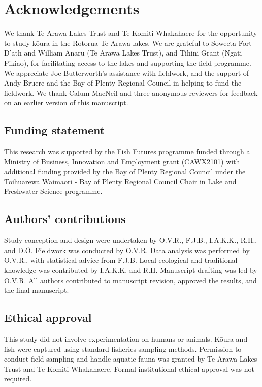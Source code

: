 \documentclass[
  12pt,
  a4paper,
  oneside]{scrbook}
\begin{document}
\section{Acknowledgements}\label{acknowledgements-2}

We thank Te Arawa Lakes Trust and Te Komiti Whakahaere for the
opportunity to study kōura in the Rotorua Te Arawa lakes. We are
grateful to Soweeta Fort-D'ath and William Anaru (Te Arawa Lakes Trust),
and Tihini Grant (Ngāti Pikiao), for facilitating access to the lakes
and supporting the field programme. We appreciate Joe Butterworth's
assistance with fieldwork, and the support of Andy Bruere and the Bay of
Plenty Regional Council in helping to fund the fieldwork. We thank Calum
MacNeil and three anonymous reviewers for feedback on an earlier version
of this manuscript.

\subsection{Funding statement}\label{funding-statement-1}

This research was supported by the Fish Futures programme funded through
a Ministry of Business, Innovation and Employment grant (CAWX2101) with
additional funding provided by the Bay of Plenty Regional Council under
the Toihuarewa Waimāori - Bay of Plenty Regional Council Chair in Lake
and Freshwater Science programme.

\subsection{Authors' contributions}\label{authors-contributions-1}

Study conception and design were undertaken by O.V.R., F.J.B., I.A.K.K.,
R.H., and D.Ö. Fieldwork was conducted by O.V.R. Data analysis was
performed by O.V.R., with statistical advice from F.J.B. Local
ecological and traditional knowledge was contributed by I.A.K.K. and
R.H. Manuscript drafting was led by O.V.R. All authors contributed to
manuscript revision, approved the results, and the final manuscript.

\subsection{Ethical approval}\label{ethical-approval-1}

This study did not involve experimentation on humans or animals. Kōura
and fish were captured using standard fisheries sampling methods.
Permission to conduct field sampling and handle aquatic fauna was
granted by Te Arawa Lakes Trust and Te Komiti Whakahaere. Formal
institutional ethical approval was not required.
\end{document}

